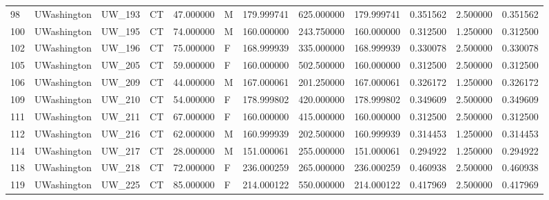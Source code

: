 \begin{tabular}{llllrlrrrrrr}
98     &     UWashington &       UW\_193 &                 CT &  47.000000 &        M &       179.999741 &    625.000000 &  179.999741 &               0.351562 &            2.500000 &          0.351562 \\
100    &     UWashington &       UW\_195 &                 CT &  74.000000 &        M &       160.000000 &    243.750000 &  160.000000 &               0.312500 &            1.250000 &          0.312500 \\
102    &     UWashington &       UW\_196 &                 CT &  75.000000 &        F &       168.999939 &    335.000000 &  168.999939 &               0.330078 &            2.500000 &          0.330078 \\
105    &     UWashington &       UW\_205 &                 CT &  59.000000 &        F &       160.000000 &    502.500000 &  160.000000 &               0.312500 &            2.500000 &          0.312500 \\
106    &     UWashington &       UW\_209 &                 CT &  44.000000 &        M &       167.000061 &    201.250000 &  167.000061 &               0.326172 &            1.250000 &          0.326172 \\
109    &     UWashington &       UW\_210 &                 CT &  54.000000 &        F &       178.999802 &    420.000000 &  178.999802 &               0.349609 &            2.500000 &          0.349609 \\
111    &     UWashington &       UW\_211 &                 CT &  67.000000 &        F &       160.000000 &    415.000000 &  160.000000 &               0.312500 &            2.500000 &          0.312500 \\
112    &     UWashington &       UW\_216 &                 CT &  62.000000 &        M &       160.999939 &    202.500000 &  160.999939 &               0.314453 &            1.250000 &          0.314453 \\
114    &     UWashington &       UW\_217 &                 CT &  28.000000 &        M &       151.000061 &    255.000000 &  151.000061 &               0.294922 &            1.250000 &          0.294922 \\
118    &     UWashington &       UW\_218 &                 CT &  72.000000 &        F &       236.000259 &    265.000000 &  236.000259 &               0.460938 &            2.500000 &          0.460938 \\
119    &     UWashington &       UW\_225 &                 CT &  85.000000 &        F &       214.000122 &    550.000000 &  214.000122 &               0.417969 &            2.500000 &          0.417969 \\

\end{tabular}
